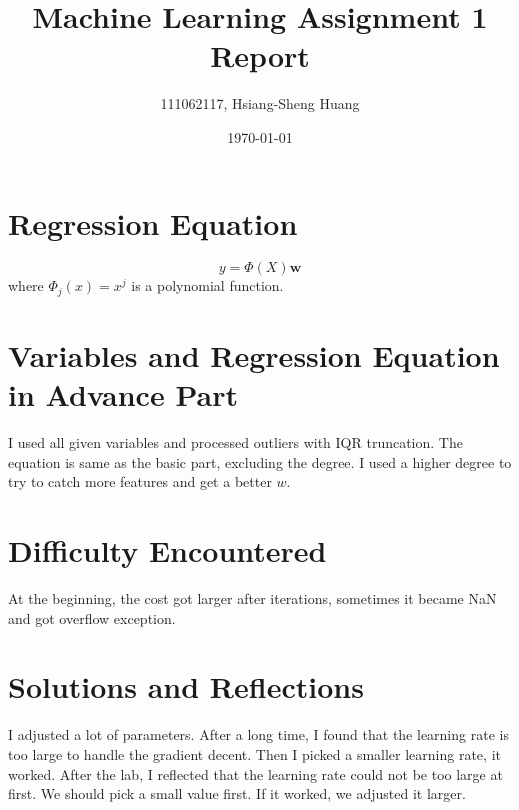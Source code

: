 \documentclass[12pt]{article}
\title{Machine Learning Assignment 1 Report}
\author{111062117, Hsiang-Sheng Huang}
\date{\today}
\begin{document}
\maketitle

\section{Regression Equation}
$$y=\Phi(X)\mathbf{w}$$
where $\Phi_j(x)=x^j$ is a polynomial function.

\section{Variables and Regression Equation in Advance Part}
I used all given variables and processed outliers with IQR truncation. The equation is same as the basic part, excluding the degree. I used a higher degree to try to catch more features and get a better $w$.

\section{Difficulty Encountered}
At the beginning, the cost got larger after iterations, sometimes it became NaN and got overflow exception.

\section{Solutions and Reflections}
I adjusted a lot of parameters. After a long time, I found that the learning rate is too large to handle the gradient decent. Then I picked a smaller learning rate, it worked.
After the lab, I reflected that the learning rate could not be too large at first. We should pick a small value first. If it worked, we adjusted it larger.
\end{document}

